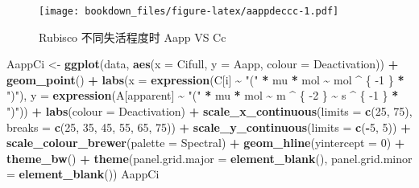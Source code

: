 \documentclass[
]{krantz}
\makeatletter
\newenvironment{Shaded}{\begin{snugshade}}{\end{snugshade}}
\newcommand{\DataTypeTok}[1]{\textcolor[rgb]{0.13,0.29,0.53}{#1}}
\newcommand{\DecValTok}[1]{\textcolor[rgb]{0.00,0.00,0.81}{#1}}
\newcommand{\KeywordTok}[1]{\textcolor[rgb]{0.13,0.29,0.53}{\textbf{#1}}}
\newcommand{\NormalTok}[1]{#1}
\newcommand{\OperatorTok}[1]{\textcolor[rgb]{0.81,0.36,0.00}{\textbf{#1}}}
\newcommand{\StringTok}[1]{\textcolor[rgb]{0.31,0.60,0.02}{#1}}
\newenvironment{kframe}{%
\medskip{}
\setlength{\fboxsep}{.8em}
 \def\at@end@of@kframe{}%
 \ifinner\ifhmode%
  \def\at@end@of@kframe{\end{minipage}}%
  \begin{minipage}{\columnwidth}%
 \fi\fi%
 \def\FrameCommand##1{\hskip\@totalleftmargin \hskip-\fboxsep
 \colorbox{shadecolor}{##1}\hskip-\fboxsep
     \hskip-\linewidth \hskip-\@totalleftmargin \hskip\columnwidth}%
 \MakeFramed {\advance\hsize-\width
   \@totalleftmargin\z@ \linewidth\hsize
   \@setminipage}}%
 {\par\unskip\endMakeFramed%
 \at@end@of@kframe}
\renewenvironment{Shaded}{\begin{kframe}}{\end{kframe}}
\makeatother
\begin{document}
\begin{figure}
\centering
\texttt{[image: bookdown\_files/figure-latex/aappdeccc-1.pdf]}
\caption{\label{fig:aappdeccc}Rubisco 不同失活程度时 Aapp VS Cc}
\end{figure}

\begin{Shaded}
\begin{Highlighting}[]
\NormalTok{AappCi \textless{}{-}}
\StringTok{  }\KeywordTok{ggplot}\NormalTok{(data, }\KeywordTok{aes}\NormalTok{(}\DataTypeTok{x =}\NormalTok{ Cifull, }\DataTypeTok{y =}\NormalTok{ Aapp, }\DataTypeTok{colour =}\NormalTok{ Deactivation)) }\OperatorTok{+}
\StringTok{  }\KeywordTok{geom\_point}\NormalTok{() }\OperatorTok{+}
\StringTok{  }\KeywordTok{labs}\NormalTok{(}\DataTypeTok{x =} \KeywordTok{expression}\NormalTok{(C[i] }\OperatorTok{\textasciitilde{}}\StringTok{ "("} \OperatorTok{*}\StringTok{ }\NormalTok{mu }\OperatorTok{*}\StringTok{ }\NormalTok{mol }\OperatorTok{\textasciitilde{}}\StringTok{ }\NormalTok{mol }\OperatorTok{\^{}}\StringTok{ }\NormalTok{\{}
    \DecValTok{{-}1}
\NormalTok{  \} }\OperatorTok{*}\StringTok{ ")"}\NormalTok{),}
  \DataTypeTok{y =} \KeywordTok{expression}\NormalTok{(A[apparent] }\OperatorTok{\textasciitilde{}}\StringTok{ "("} \OperatorTok{*}\StringTok{ }\NormalTok{mu }\OperatorTok{*}\StringTok{ }\NormalTok{mol }\OperatorTok{\textasciitilde{}}\StringTok{ }\NormalTok{m }\OperatorTok{\^{}}\StringTok{ }\NormalTok{\{}
    \DecValTok{{-}2}
\NormalTok{  \} }\OperatorTok{\textasciitilde{}}\StringTok{ }\NormalTok{s }\OperatorTok{\^{}}\StringTok{ }\NormalTok{\{}
    \DecValTok{{-}1}
\NormalTok{  \} }\OperatorTok{*}\StringTok{ ")"}\NormalTok{)) }\OperatorTok{+}
\StringTok{  }\KeywordTok{labs}\NormalTok{(}\DataTypeTok{colour =} \StringTok{\textquotesingle{}Deactivation\textquotesingle{}}\NormalTok{) }\OperatorTok{+}
\StringTok{  }\KeywordTok{scale\_x\_continuous}\NormalTok{(}\DataTypeTok{limits =} \KeywordTok{c}\NormalTok{(}\DecValTok{25}\NormalTok{, }\DecValTok{75}\NormalTok{),}
                     \DataTypeTok{breaks =} \KeywordTok{c}\NormalTok{(}\DecValTok{25}\NormalTok{, }\DecValTok{35}\NormalTok{, }\DecValTok{45}\NormalTok{, }\DecValTok{55}\NormalTok{, }\DecValTok{65}\NormalTok{, }\DecValTok{75}\NormalTok{)) }\OperatorTok{+}
\StringTok{  }\KeywordTok{scale\_y\_continuous}\NormalTok{(}\DataTypeTok{limits =} \KeywordTok{c}\NormalTok{(}\OperatorTok{{-}}\DecValTok{5}\NormalTok{, }\DecValTok{5}\NormalTok{)) }\OperatorTok{+}
\StringTok{  }\KeywordTok{scale\_colour\_brewer}\NormalTok{(}\DataTypeTok{palette =} \StringTok{\textquotesingle{}Spectral\textquotesingle{}}\NormalTok{) }\OperatorTok{+}
\StringTok{  }\KeywordTok{geom\_hline}\NormalTok{(}\DataTypeTok{yintercept =} \DecValTok{0}\NormalTok{) }\OperatorTok{+}
\StringTok{  }\KeywordTok{theme\_bw}\NormalTok{() }\OperatorTok{+}
\StringTok{  }\KeywordTok{theme}\NormalTok{(}\DataTypeTok{panel.grid.major =} \KeywordTok{element\_blank}\NormalTok{(),}
        \DataTypeTok{panel.grid.minor =} \KeywordTok{element\_blank}\NormalTok{())}
\NormalTok{AappCi}
\end{Highlighting}
\end{Shaded}
\end{document}
